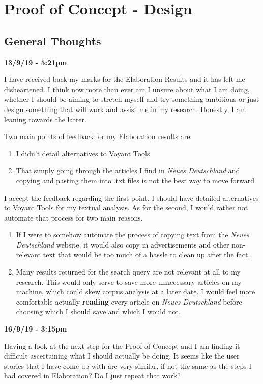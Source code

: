 \documentclass{article}
\begin{document}
\newpage
\section{Proof of Concept - Design}

\subsection{General Thoughts}

\textbf{13/9/19 - 5:21pm}

I have received back my marks for the Elaboration Results and it has left me disheartened. I think now more than ever am I unsure about what I am doing, whether I should be aiming to stretch myself and try something ambitious or just design something that will work and assist me in my research. Honestly, I am leaning towards the latter.

Two main points of feedback for my Elaboration results are:
\begin{enumerate}
    \item I didn't detail alternatives to Voyant Tools
    \item That simply going through the articles I find in \textit{Neues Deutschland} and copying and pasting them into .txt files is not the best way to move forward
\end{enumerate}

I accept the feedback regarding the first point. I should have detailed alternatives to Voyant Tools for my textual analysis. As for the second, I would rather not automate that process for two main reasons.
\begin{enumerate}
    \item If I were to somehow automate the process of copying text from the \textit{Neues Deutschland} website, it would also copy in advertisements and other non-relevant text that would be too much of a hassle to clean up after the fact.
    \item Many results returned for the search query are not relevant at all to my research. This would only serve to save more unnecessary articles on my machine, which could skew corpus analysis at a later date. I would feel more comfortable actually \textbf{reading} every article on \textit{Neues Deutschland} before choosing which I should save and which I would not.
\end{enumerate}

\textbf{16/9/19 - 3:15pm}

Having a look at the next step for the Proof of Concept and I am finding it difficult ascertaining what I should actually be doing. It seems like the user stories that I have come up with are very similar, if not the same as the steps I had covered in Elaboration? Do I just repeat that work?
\end{document}
